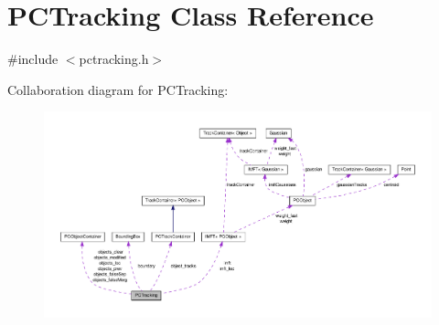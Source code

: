 \hypertarget{class_p_c_tracking}{\section{\-P\-C\-Tracking \-Class \-Reference}
\label{class_p_c_tracking}
}


{\ttfamily \#include $<$pctracking.\-h$>$}



\-Collaboration diagram for \-P\-C\-Tracking\-:
\nopagebreak
\begin{figure}[H]
\begin{center}
\leavevmode
\includegraphics[width=350pt]{class_p_c_tracking__coll__graph}
\end{center}
\end{figure}
